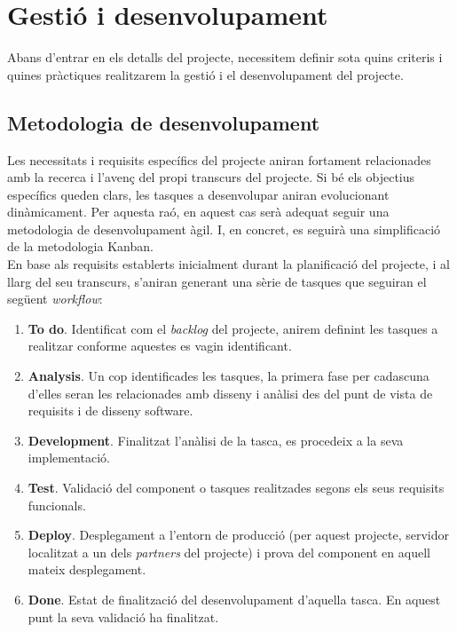 
\chapter{Gestió i desenvolupament} %

\label{GestioIDesenvolupament} %

Abans d'entrar en els detalls del projecte, necessitem definir sota quins criteris i quines pràctiques realitzarem la gestió i el desenvolupament del projecte.


\section{Metodologia de desenvolupament}

Les necessitats i requisits específics del projecte aniran fortament relacionades amb la recerca i l’avenç del propi transcurs del projecte. Si bé els objectius específics queden clars, les tasques a desenvolupar aniran evolucionant dinàmicament. Per aquesta raó, en aquest cas serà adequat seguir una metodologia de desenvolupament àgil. I, en concret, es seguirà una simplificació de la metodologia Kanban\cite{kanban1}. \\

En base als requisits establerts inicialment durant la planificació del projecte, i al llarg del seu transcurs, s’aniran generant una sèrie de tasques que seguiran el següent \textit{workflow}:

\begin{enumerate}
\item \textbf{To do}. Identificat com el \textit{backlog} del projecte, anirem definint les tasques a realitzar conforme aquestes es vagin identificant.
\item \textbf{Analysis}. Un cop identificades les tasques, la primera fase per cadascuna d'elles seran les relacionades amb disseny i anàlisi des del punt de vista de requisits i de disseny software.
\item \textbf{Development}. Finalitzat l'anàlisi de la tasca, es procedeix a la seva implementació.
\item \textbf{Test}. Validació del component o tasques realitzades segons els seus requisits funcionals.
\item \textbf{Deploy}. Desplegament a l'entorn de producció (per aquest projecte, servidor localitzat a un dels \textit{partners} del projecte) i prova del component en aquell mateix desplegament.
\item \textbf{Done}. Estat de finalització del desenvolupament d'aquella tasca. En aquest punt la seva validació ha finalitzat.
\end{enumerate}

